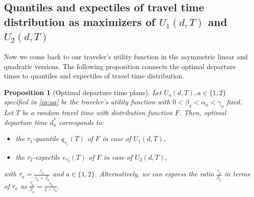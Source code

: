\documentclass[preprint, 3p, authoryear]{elsarticle} %
\newtheorem{proposition}{Proposition}[section]
\theoremstyle{definition}
\theoremstyle{definition}
\theoremstyle{definition}
\theoremstyle{definition}
\theoremstyle{remark}
\begin{document}
\hypertarget{quantiles-and-expectiles-of-travel-time-distribution-as-maximizers-of-u_1dt-and-u_2dt}{%
\subsection{\texorpdfstring{Quantiles and expectiles of travel time distribution as maximizers of \(U_1(d,T)\) and \(U_2(d,T)\)}{Quantiles and expectiles of travel time distribution as maximizers of U\_1(d,T) and U\_2(d,T)}}\label{quantiles-and-expectiles-of-travel-time-distribution-as-maximizers-of-u_1dt-and-u_2dt}}

Now we come back to our traveler's utility function in the asymmetric linear and quadratic versions. The following proposition connects the optimal departure times to quantiles and expectiles of travel time distribution.

\begin{proposition}[Optimal departure time plans]
\protect\hypertarget{prp:proputil}{}\label{prp:proputil}Let \(U_a(d,T), a\in\{1,2\}\) specified in \eqref{eq:ua} be the traveler's utility function with \(0<\beta_a<\alpha_a<\gamma_a\) fixed. Let \(T\) be a random travel time with distribution function \(F\). Then, optimal departure time \(d_a^*\) corresponds to:

\begin{itemize}
\item
  the \(\tau_1\)-quantile \(q_{\tau_1}(T)\) of \(F\) in case of \(U_1(d,T)\),
\item
  the \(\tau_2\)-expectile \(e_{\tau_2}(T)\) of \(F\) in case of \(U_2(d,T)\),
\end{itemize}

with \(\tau_a=\frac{\gamma_a}{\gamma_a+\beta_a}\) and \(a\in\{1,2\}\). Alternatively, we can express the ratio \(\frac{\gamma_a}{\beta_a}\) in terms of \(\tau_a\) as \(\frac{\gamma_a}{\beta_a} = \frac{\tau_a}{1-\tau_a}.\)
\end{proposition}
\end{document}
